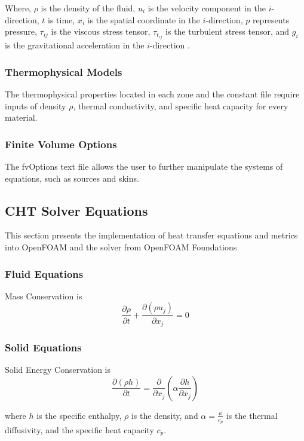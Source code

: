 Where, $\rho$ is the density of the fluid, $u_i$ is the velocity component in the $i$-direction, $t$ is time, $x_i$ is the spatial coordinate in the $i$-direction, $p$ represents pressure, $\tau_{ij}$ is the viscous stress tensor, $\tau_{t_{ij}}$ is the turbulent stress tensor, and $g_i$ is the gravitational acceleration in the $i$-direction
 \cite{cht}.


\subsubsection{Thermophysical Models}
The thermophysical properties located in each zone and the constant file require inputs of density $\rho$, thermal conductivity, and specific heat capacity for every material.
\subsubsection{Finite Volume Options}
The fvOptions text file allows the user to further manipulate the systems of equations, such as sources and skins. 

\subsection{CHT Solver Equations}    

This section presents the implementation of heat transfer equations and metrics into OpenFOAM and the solver from OpenFOAM Foundations\cite{OpenFOAMFoundation}
\subsubsection{Fluid Equations}

      Mass Conservation is \begin{equation}
\frac{\partial \rho}{\partial t} + \frac{\partial (\rho u_j)}{\partial x_j} = 0
\end{equation}


     

\subsubsection{Solid Equations}
Solid Energy Conservation is \begin{equation}
\frac{\partial (\rho h)}{\partial t} = \frac{\partial}{\partial x_j}\left( \alpha \frac{\partial h}{\partial x_j} \right)
\end{equation}

where \( h \) is the specific enthalpy, \( \rho \) is the density, and \( \alpha = \frac{\kappa}{c_p} \) is the thermal diffusivity, and the specific heat capacity \( c_p \). 


